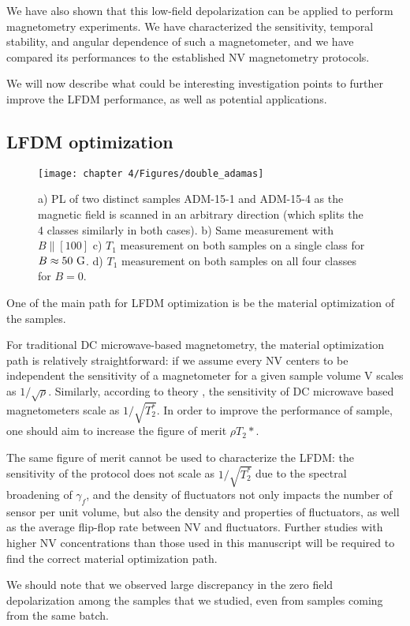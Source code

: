 \documentclass[a4paper, 11pt]{report}
\begin{document}
We have also shown that this low-field depolarization can be applied to perform magnetometry experiments. We have characterized the sensitivity, temporal stability, and angular dependence of such a magnetometer, and we have compared its performances to the established NV magnetometry protocols.

We will now describe what could be interesting investigation points to further improve the LFDM performance, as well as potential applications.

\subsection{LFDM optimization}
\begin{figure}[h!]
\centering
\texttt{[image: chapter 4/Figures/double\_adamas]}
\caption{a) PL of two distinct samples ADM-15-1 and ADM-15-4 as the magnetic field is scanned in an arbitrary direction (which splits the 4 classes similarly in both cases). b) Same measurement with $B\parallel [100]$ c) $T_1$ measurement on both samples on a single class for $B\approx 50\ \rm G$. d) $T_1$ measurement on both samples on all four classes for $B=0$.}
\label{double dragon}
\end{figure}

One of the main path for LFDM optimization is be the material optimization of the samples.

For traditional DC microwave-based magnetometry, the material optimization path is relatively straightforward: if we assume every NV centers to be independent the sensitivity of a magnetometer for a given sample volume V scales as $1/\sqrt{\rho}$. Similarly, according to theory \citep{barry2020sensitivity}, the sensitivity of DC microwave based magnetometers scale as $1/\sqrt{T_2^*}$. In order to improve the performance of sample, one should aim to increase the figure of merit $\rho T_2*$.

The same figure of merit cannot be used to characterize the LFDM: the sensitivity of the protocol does not scale as $1/\sqrt{T_2^*}$ due to the spectral broadening of $\gamma_f$, and the density of fluctuators not only impacts the number of sensor per unit volume, but also the density and properties of fluctuators, as well as the average flip-flop rate between NV and fluctuators. Further studies with higher NV concentrations than those used in this manuscript will be required to find the correct material optimization path.

We should note that we observed large discrepancy in the zero field depolarization among the samples that we studied, even from samples coming from the same batch.
\end{document}
